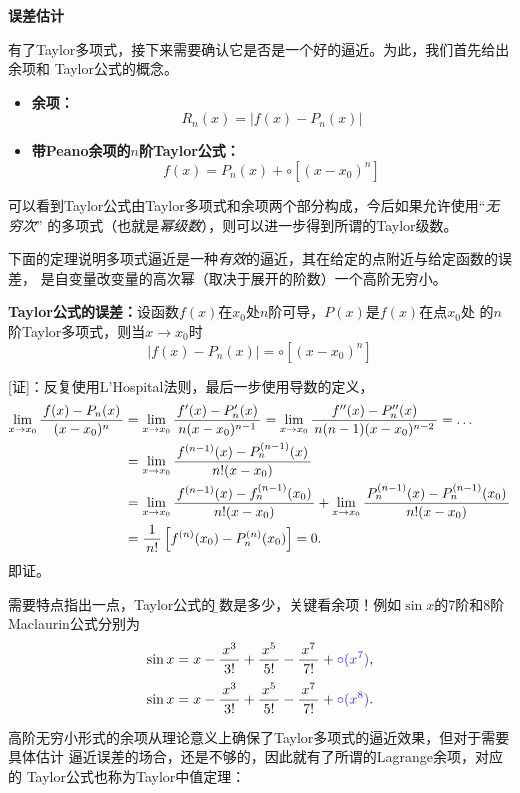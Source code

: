 {\bf 误差估计}

有了Taylor多项式，接下来需要确认它是否是一个好的逼近。为此，我们首先给出余项和
Taylor公式的概念。

\begin{thx}
	\begin{itemize}
	  \item {\bf 余项：}
	  $$R_n(x)=|f(x)-P_n(x)|$$ 
	  \item {\bf 带Peano余项的$n$阶Taylor公式：}
	  $$f(x)=P_n(x)+\circ[(x-x_0)^n]$$
	\end{itemize}
\end{thx}

可以看到Taylor公式由Taylor多项式和余项两个部分构成，今后如果允许使用“{\it 无穷次}”
的多项式（也就是{\it 幂级数}），则可以进一步得到所谓的{\kaishu Taylor级数}。

下面的定理说明多项式逼近是一种{\it 有效}的逼近，其在给定的点附近与给定函数的误差，
是自变量改变量的高次幂（取决于展开的阶数）一个高阶无穷小。

\begin{thx}
	{\bf Taylor公式的误差：}设函数$f(x)$在$x_0$处$n$阶可导，$P(x)$是$f(x)$在点$x_0$处
	的$n$阶Taylor多项式，则当$x\to x_0$时
	$${|f(x)-P_n(x)|=\circ[(x-x_0)^n]}$$
\end{thx}

[证]：反复使用L'Hospital法则，最后一步使用导数的定义，
\begin{align*}
	\lim\limits_{x\to{x_0}}\displaystyle\frac{\,{f(x)-P_n(x)}\,}{\,{(x-x_0)^n}\,}
	&=\lim\limits_{x\to{x_0}}\displaystyle\frac{\,{f'(x)-P'_n(x)}\,}{\,{n(x-x_0)^{n-1}}\,}
	=\lim\limits_{x\to{x_0}}\displaystyle\frac{\,{f''(x)-P''_n(x)}\,}{\,{n(n-1)(x-x_0)^{n-2}}\,}=\ldots\\
	&=\lim\limits_{x\to{x_0}}\displaystyle\frac{\,{f^{(n-1)}(x)-P^{(n-1)}_n(x)}\,}{\,{n!(x-x_0)}\,}\\
	&=\lim\limits_{x\to{x_0}}\displaystyle\frac{\,{f^{(n-1)}(x)-f^{(n-1)}_n(x_0)}\,}{\,{n!(x-x_0)}\,}
	+\lim\limits_{x\to{x_0}}\displaystyle\frac{\,{P_n^{(n-1)}(x)-P^{(n-1)}_n(x_0)}\,}{\,{n!(x-x_0)}\,}\\
	&=\displaystyle\frac{\,{1}\,}{\,{n!}\,}\left[f^{(n)}(x_0)-P_n^{(n)}(x_0)\right]=0.
\end{align*}
即证。\fin

需要特点指出一点，Taylor公式的{\b 阶数是多少，关键看余项！}例如$\sin x$的7阶和8阶Maclaurin公式分别为
$$\sin x=x-\df{x^3}{3!}+\df{x^5}{5!}-\df{x^7}{7!}+{\b\circ(x^7)},$$
$$\sin x=x-\df{x^3}{3!}+\df{x^5}{5!}-\df{x^7}{7!}+{\b\circ(x^8)}.$$

高阶无穷小形式的余项从理论意义上确保了Taylor多项式的逼近效果，但对于需要具体估计
逼近误差的场合，还是不够的，因此就有了所谓的{\kaishu Lagrange余项}，对应的
Taylor公式也称为Taylor中值定理：

